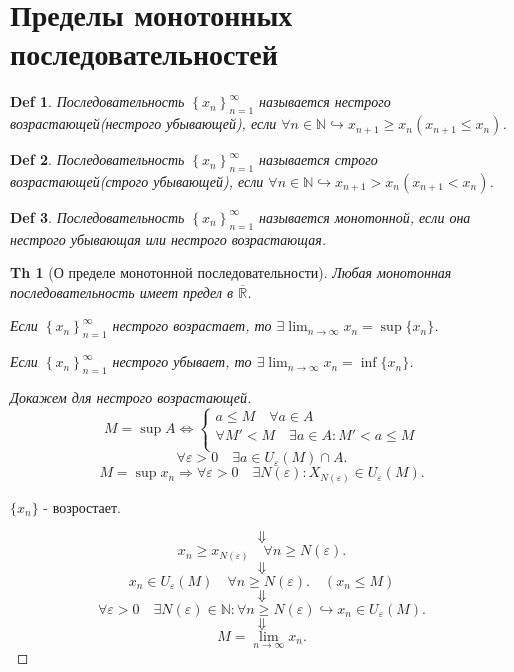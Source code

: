 \documentclass[a5paper, 10pt]{article}
\theoremstyle{plain}
\newtheorem*{theorem_}{Th}
\newtheorem{definition}{Def}
\newcommand{\N}{\mathbb N}
\newcommand{\eps}{\varepsilon}
\newcommand{\oR}{\overline{\mathbb R}}
\newcommand{\hrarrow}{\hookrightarrow}
\newcommand{\Rarrow}{\Rightarrow}
\newcommand{\Lrarrow}{\Leftrightarrow}
\begin{document}
    \section{Пределы монотонных последовательностей}

    \begin{definition}
        Последовательность $ \left\{x_n \right\}_{n = 1}^{\infty} $ называется нестрого
        возрастающей(нестрого убывающей), если
        $ \forall n \in \N \hrarrow x_{n+1} \geq x_n (x_{n+1} \leq x_n) $.
    \end{definition}

    \begin{definition}
        Последовательность $ \left\{x_n \right\}_{n = 1}^{\infty} $ называется строго
        возрастающей(строго убывающей), если
        $ \forall n \in \N \hrarrow x_{n+1} > x_n (x_{n+1} < x_n) $.
    \end{definition}

    \begin{definition}
        Последовательность $ \left\{x_n \right\}_{n = 1}^{\infty} $ называется монотонной,
        если она нестрого убывающая или нестрого возрастающая.
    \end{definition}

    \begin{theorem_}[О пределе монотонной последовательности]
        Любая монотонная последовательность имеет предел в $ \oR $.

        Если $ \left\{x_n \right\}_{n = 1}^{\infty} $ нестрого возрастает, то
        $ \exists \lim_{n \to \infty} x_n = \sup \{ x_n \} $.

        Если $ \left\{x_n \right\}_{n = 1}^{\infty} $ нестрого убывает, то
        $ \exists \lim_{n \to \infty} x_n = \inf \{ x_n \} $.
    \end{theorem_}

    \begin{proof}[Докажем для нестрого возрастающей]
        \[ M = \sup{A} \Lrarrow
        \begin{cases}
            a \leq M \quad \forall a \in A \\
            \forall M' < M \quad \exists a \in A: M' < a \leq M \\
        \end{cases}
        \]
        \[
        \forall \eps > 0 \quad \exists a \in U_{\eps}(M) \cap A
        .\]
        \[
            M = \sup{x_n} \Rarrow
            \forall \eps > 0 \quad \exists N(\eps): X_{N(\eps)} \in U_{\eps}(M)
        .\]

        \begin{center}
            $  \{ x_n \} $ - возростает.
        \end{center}
        \[ \Downarrow \] \[
        x_n \geq x_{N(\eps)} \quad \forall n \geq N(\eps).
        \] \[ \Downarrow \] \[
        x_n \in U_{\eps}(M) \quad \forall n \geq N(\eps). \quad (x_n \leq M )
        \] \[ \Downarrow \] \[
        \forall \eps > 0 \quad \exists N(\eps) \in \N: \forall n \geq N(\eps) \hrarrow
        x_n \in U_{\eps}(M).
        \] \[ \Downarrow \] \[
            M = \lim_{n \to \infty} x_n.
        \]
    \end{proof}
\end{document}
